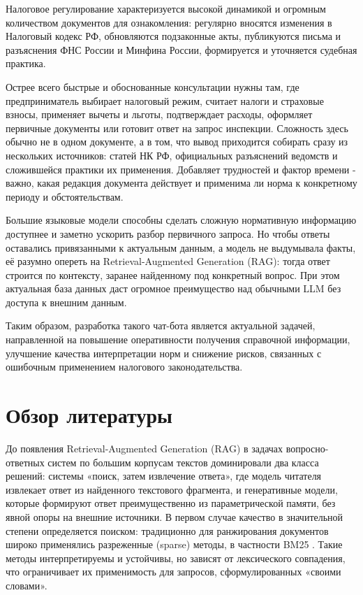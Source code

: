 \documentclass[a4paper,12pt]{article}
\begin{document}
Налоговое регулирование характеризуется высокой динамикой и огромным количеством документов для ознакомления: регулярно вносятся изменения в Налоговый кодекс РФ, обновляются подзаконные акты, публикуются письма и разъяснения ФНС России и Минфина России, формируется и уточняется судебная практика.

Острее всего быстрые и обоснованные консультации нужны там, где предприниматель выбирает налоговый режим, считает налоги и страховые взносы, применяет вычеты и льготы, подтверждает расходы, оформляет первичные документы или готовит ответ на запрос инспекции. Сложность здесь обычно не в одном документе, а в том, что вывод приходится собирать сразу из нескольких источников: статей НК РФ, официальных разъяснений ведомств и сложившейся практики их применения. Добавляет трудностей и фактор времени - важно, какая редакция документа действует и применима ли норма к конкретному периоду и обстоятельствам.

Большие языковые модели способны сделать сложную нормативную информацию доступнее и заметно ускорить разбор первичного запроса. Но чтобы ответы оставались привязанными к актуальным данным, а модель не выдумывала факты, её разумно опереть на Retrieval-Augmented Generation (RAG): тогда ответ строится по контексту, заранее найденному под конкретный вопрос. При этом актуальная база данных даст огромное преимущество над обычными LLM без доступа к внешним данным.

Таким образом, разработка такого чат-бота является актуальной задачей, направленной на повышение оперативности получения справочной информации, улучшение качества интерпретации норм и снижение рисков, связанных с ошибочным применением налогового законодательства.

\newpage
\section{Обзор литературы}

До появления Retrieval-Augmented Generation (RAG) в задачах вопросно-ответных систем по большим корпусам текстов доминировали два класса решений: системы «поиск, затем извлечение ответа», где модель читателя извлекает ответ из найденного текстового фрагмента, и генеративные модели, которые формируют ответ преимущественно из параметрической памяти, без явной опоры на внешние источники. В первом случае качество в значительной степени определяется поиском: традиционно для ранжирования документов широко применялись разреженные (sparse) методы, в частности BM25 \cite{robertson1994okapi}. Такие методы интерпретируемы и устойчивы, но зависят от лексического совпадения, что ограничивает их применимость для запросов, сформулированных «своими словами».
\end{document}
